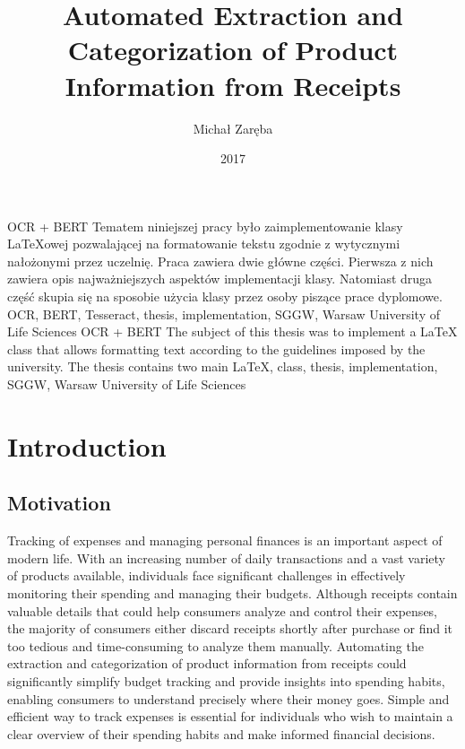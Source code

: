 \documentclass{SGGW-thesis-EN}
\title{Automated Extraction and Categorization of Product Information from Receipts}
\author{Michał Zaręba}
\date{2017}
\begin{document}
\maketitle
\statementpage
\abstractpage
{OCR + BERT}
{Tematem niniejszej pracy było zaimplementowanie klasy \LaTeX{}owej pozwalającej na formatowanie tekstu zgodnie z wytycznymi nałożonymi przez uczelnię. Praca zawiera dwie
główne części. Pierwsza z nich zawiera opis najważniejszych aspektów implementacji klasy. Natomiast druga część skupia się na sposobie użycia klasy przez osoby piszące prace
dyplomowe.}
{OCR, BERT, Tesseract, thesis, implementation, SGGW, Warsaw University of Life Sciences}
{OCR + BERT}
{The subject of this thesis was to implement a \LaTeX{} class that allows formatting text according to the guidelines imposed by the university. The thesis contains two main}
{LaTeX, class, thesis, implementation, SGGW, Warsaw University of Life Sciences}



\tableofcontents


\startchapterfromoddpage %

\chapter{Introduction}

\section{Motivation}
Tracking of expenses and managing personal finances is an important aspect of modern life.
With an increasing number of daily transactions and a vast variety of products available, individuals face significant challenges in effectively monitoring their spending and managing their budgets. 
Although receipts contain valuable details that could help consumers analyze and control their expenses, 
the majority of consumers either discard receipts shortly after purchase or find it too tedious and time-consuming to analyze them manually. 
Automating the extraction and categorization of product information from receipts could significantly simplify budget tracking and provide insights into spending habits, enabling consumers to understand precisely where their money goes.
Simple and efficient way to track expenses is essential for individuals who wish to maintain a clear overview of their spending habits and make informed financial decisions. 
\end{document}
